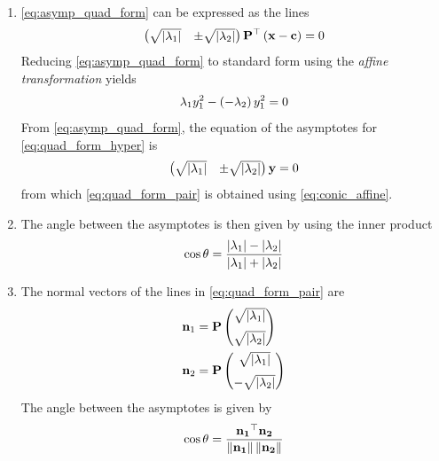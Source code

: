 \documentclass[journal,12pt,twocolumn]{IEEEtran}
\renewcommand\thesection{\arabic{section}}
\renewcommand\thesubsection{\thesection.\arabic{subsection}}
\begin{document}
\begin{enumerate}[label=\thesubsection.\arabic*.,ref=\thesubsection.\theenumi]
\item \eqref{eq:asymp_quad_form} can be expressed as the lines 
%
\begin{align} 
\label{eq:quad_form_pair}
\begin{pmatrix}\sqrt{\left\vert\lambda_1\right\vert} & \pm \sqrt{\left\vert\lambda_2\right\vert}\end{pmatrix}\mathbf{P}^{\top}\left(\mathbf{x}-\mathbf{c}\right) = 0
\end{align} 
\solution Reducing   \eqref{eq:asymp_quad_form} to standard form using the {\em affine transformation} yields
  \begin{align} 
    \lambda_1y_1^2 -\left(-\lambda_2\right)y_1^2 = 0
    \label{eq:quad_form_hyper}
    \end{align}
    From \eqref{eq:asymp_quad_form},
    the equation of the asymptotes for \eqref{eq:quad_form_hyper} is
    \begin{align} 
    \begin{pmatrix}\sqrt{\left\vert\lambda_1\right\vert} & \pm \sqrt{\left\vert\lambda_2\right\vert}\end{pmatrix}\mathbf{y} = 0
    \end{align} 
  from which \eqref{eq:quad_form_pair} is obtained using \eqref{eq:conic_affine}.
  \item The angle between the asymptotes is then given by using the inner product
\begin{align} 
\label{eq:quad_form_pair_ang}
\cos\theta=\frac{\left\vert\lambda_1\right\vert-\left\vert\lambda_2\right\vert}
{\left\vert\lambda_1\right\vert+\left\vert\lambda_2\right\vert}
\end{align} 
\item The normal vectors of the lines in \eqref{eq:quad_form_pair} are 
  \begin{align} 
  \label{eq:quad_form_pair_normvecs}
  \begin{split}
  \mathbf{n}_1 &= \mathbf{P}\begin{pmatrix}\sqrt{\left\vert\lambda_1\right\vert} \\[2mm]  \sqrt{\left\vert\lambda_2\right\vert}\end{pmatrix}
  \\
  \mathbf{n}_2 &= \mathbf{P}\begin{pmatrix}\sqrt{\left\vert\lambda_1\right\vert} \\[2mm] - \sqrt{\left\vert\lambda_2\right\vert}\end{pmatrix}
  \end{split}
  \end{align} 
  The angle between the asymptotes is given by 
\begin{align} 
\label{eq:quad_form_pair_ang_exp}
\cos\theta=\frac{\vec{n_1}^{\top}\vec{n_2}}{\norm{\vec{n_1}}\norm{\vec{n_2}}}

\end{align}
\end{enumerate}
\end{document}
